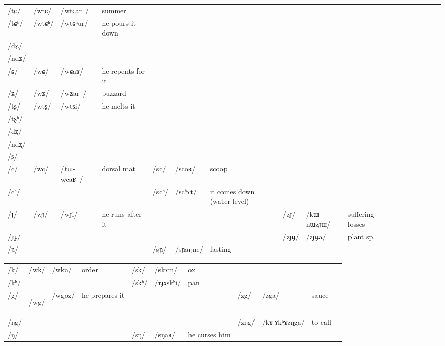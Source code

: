 \documentclass[oneside,a4paper,11pt]{article}
\newcommand{\ipa}[1]{\mbox{\phon/#1/}}
\newcommand{\deux}[1]{\ipa{#1}\addtocounter{2clusters}{1}}
\newcommand{\tib}[1]{\cellcolor{lightgray}\textbf{#1}}
\begin{document}
\begin{landscape}
\begin{table}
{\begin{tabular}{l|lll|lll|lll|lllllll}
\ipa{tɕ}  &	\deux{wtɕ}  &	\ipa{wtɕar }  &	summer&	  &	  &	&	  &	  &	&	\\
\ipa{tɕʰ}  &	\deux{wtɕʰ}  &	\ipa{wtɕʰur}  &he pours it down	&	  &	  &	&	  &	  &	&	\\
\ipa{dʑ}  &	  &	  &	&	  &	  &	&	  &	  &	&	\\
\ipa{ndʑ}  &	  &	  &	&	  &	  &	&	  &	  &	&	\\
\ipa{ɕ}  &	\deux{wɕ}  &	\ipa{wɕaʁ}  &he repents for it&	  &	  &	&	  &	  &	&	\\	
\ipa{ʑ}  &	\deux{wʑ}  &	\ipa{wʑar }  &	buzzard&	  &	  &	&	  &	  &	&	\\
\ipa{tʂ}  &	\deux{wtʂ}  &	\ipa{wtʂi}  & he melts it	&	  &	  &	&	  &	  &	&	\\
\ipa{tʂʰ}  &	  &	  &	&	  &	  &	&	  &	  &	&	\\
\ipa{dʐ}  &	  &	  &	&	  &	  &	&	  &	  &	&	\\
\ipa{ndʐ}  &	  &	  &	&	  &	  &	&	  &	  &	&	\\
\ipa{ʂ}  &	  &	  &	&	  &	  &	&	  &	  &	&	\\
\ipa{c}  &	\deux{wc}  &	\ipa{tɯ-wcaʁ }  &dorsal mat	&	\deux{sc}  &	\ipa{scoʁ}  &scoop	&	  &	  &	&	\\
\ipa{cʰ}  &	  &	  &	&	\deux{scʰ}  &	\ipa{scʰɤt}  &	it comes down (water level)&	  &	  &	&	\\
\ipa{ɟ}  &	\deux{wɟ}  &	\ipa{wɟi}  &he runs after it	&	  &	  &	&	\deux{zɟ}  &	\ipa{kɯ-nɯzɟɯ}  &	  suffering losses&	\\
\ipa{ɲɟ}  &	  &	  &	&	  &	  &	&	\deux{zɲɟ}  &	\ipa{zɲɟa}  &	plant sp.&	\\
\ipa{ɲ}  &	  &	  &	&	\deux{sɲ}  &	\ipa{sɲaŋne}  &fasting	&	   &	 &	&	\\
\midrule							
\end{tabular}}
\end{table}
 \begin{table}
\begin{tabular}{l|lll|lll|lll|l}
\toprule
\ipa{k}  &	\deux{wk}  &	\ipa{wka}  &	order&	\deux{sk}  &	\ipa{skɤm}  &	ox&	  &	  &	&	\\
\ipa{kʰ}  &	  &	  &	&	\deux{skʰ}  &	\ipa{rɟɤskʰi}  &pan	&	  &	  &	&	\\
\ipa{g}  &	\deux{wg}  \tib{}&	\ipa{wgoz}  &	he prepares it&	  &	  &	& 	\deux{zg}  &	\ipa{zga}  &	sauce&	\\
\ipa{ŋg}  &	  &	  &	&	  &	  &	&	\deux{zŋg}  &	\ipa{kɤ-ɤkʰɤzŋga}  &	to call&	\\
\ipa{ŋ}  &	  &	  &	&	\deux{sŋ}  &	\ipa{sŋaʁ}  &	he curses him&	  &	  &	&	\\

\end{tabular}
\end{table}
\end{landscape}
\end{document}

